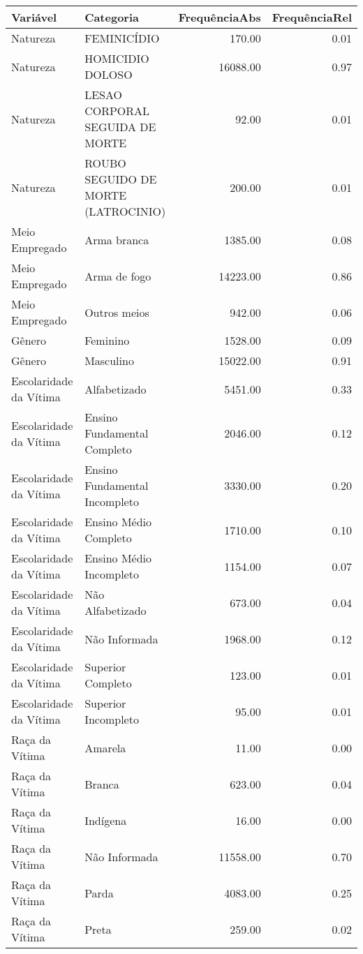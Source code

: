 \begin{table}[ht]
\centering
\begin{tabular}{llrr}
  \hline
Variável & Categoria & FrequênciaAbs & FrequênciaRel \\ 
  \hline
Natureza & FEMINICÍDIO & 170.00 & 0.01 \\ 
  Natureza & HOMICIDIO DOLOSO & 16088.00 & 0.97 \\ 
  Natureza & LESAO CORPORAL SEGUIDA DE MORTE & 92.00 & 0.01 \\ 
  Natureza & ROUBO SEGUIDO DE MORTE (LATROCINIO) & 200.00 & 0.01 \\ 
  Meio Empregado & Arma branca & 1385.00 & 0.08 \\ 
  Meio Empregado & Arma de fogo & 14223.00 & 0.86 \\ 
  Meio Empregado & Outros meios & 942.00 & 0.06 \\ 
  Gênero & Feminino & 1528.00 & 0.09 \\ 
  Gênero & Masculino & 15022.00 & 0.91 \\ 
  Escolaridade da Vítima & Alfabetizado & 5451.00 & 0.33 \\ 
  Escolaridade da Vítima & Ensino Fundamental Completo & 2046.00 & 0.12 \\ 
  Escolaridade da Vítima & Ensino Fundamental Incompleto & 3330.00 & 0.20 \\ 
  Escolaridade da Vítima & Ensino Médio Completo & 1710.00 & 0.10 \\ 
  Escolaridade da Vítima & Ensino Médio Incompleto & 1154.00 & 0.07 \\ 
  Escolaridade da Vítima & Não Alfabetizado & 673.00 & 0.04 \\ 
  Escolaridade da Vítima & Não Informada & 1968.00 & 0.12 \\ 
  Escolaridade da Vítima & Superior Completo & 123.00 & 0.01 \\ 
  Escolaridade da Vítima & Superior Incompleto & 95.00 & 0.01 \\ 
  Raça da Vítima & Amarela & 11.00 & 0.00 \\ 
  Raça da Vítima & Branca & 623.00 & 0.04 \\ 
  Raça da Vítima & Indígena & 16.00 & 0.00 \\ 
  Raça da Vítima & Não Informada & 11558.00 & 0.70 \\ 
  Raça da Vítima & Parda & 4083.00 & 0.25 \\ 
  Raça da Vítima & Preta & 259.00 & 0.02 \\ 

\end{tabular}
\end{table}

